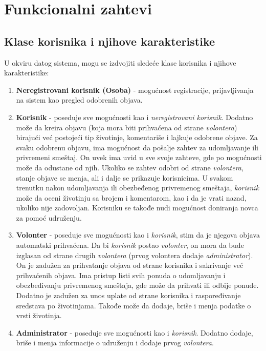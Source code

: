 \documentclass[a4paper]{article}
\begin{document}
    
    

    \section{Funkcionalni zahtevi}
    \subsection{Klase korisnika i njihove karakteristike}
    \par U okviru datog sistema, mogu se izdvojiti sledeće klase korisnika i njihove karakteristike:
    \begin{enumerate}
        \item \textbf{Neregistrovani korisnik (Osoba)} - mogućnost registracije, prijavljivanja na sistem kao pregled odobrenih objava.
        \item \textbf{Korisnik} - poseduje sve mogućnosti kao i \textit{neregistrovani korisnik}. Dodatno može da kreira objavu (koja mora biti prihvaćena od strane
        \textit{volontera}) birajući već postojeći tip životinje, komentariše i lajkuje odobrene objave. Za svaku odobrenu objavu, ima mogućnost da pošalje zahtev za udomljavanje ili 
        privremeni smeštaj. On uvek ima uvid u sve svoje zahteve, gde po mogućnosti može da odustane od njih. Ukoliko se zahtev odobri od strane \textit{volontera}, stanje objave se menja, 
        ali i dalje se prikazuje korisnicima. U svakom trenutku nakon udomljavanja ili obezbeđenog privremenog smeštaja, \textit{korisnik} može da oceni životinju sa brojem i komentarom, 
        kao i da je vrati nazad, ukoliko nije zadovoljan. Korisniku se takođe nudi mogućnost doniranja novca za pomoć udruženju.
        \item \textbf{Volonter} - poseduje sve mogućnosti kao i \textit{korisnik}, stim da je njegova objava automatski prihvaćena. Da bi \textit{korisnik} postao \textit{volonter}, on mora
        da bude izglasan od strane drugih \textit{volontera} (prvog volontera dodaje \textit{administrator}). On je zadužen za prihvatanje objava od strane korisnika i sakrivanje već 
        prihvaćenih objava. Ima pristup listi svih ponuda o udomljavanju i obezbeđivanju privremenog smeštaja, gde može da prihvati ili odbije ponude. Dodatno je zadužen za unos uplate od 
        strane korisnika i raspoređivanje sredstava po životinjama. Takođe može da dodaje, briše i menja podatke o vrsti životinja. 
        \item \textbf{Administrator} - poseduje sve mogućnosti kao i \textit{korisnik}. Dodatno dodaje, briše i menja informacije o udruženju i dodaje prvog \textit{volontera}.
    \end{enumerate} 
\end{document}
